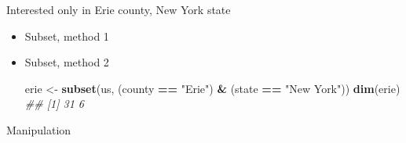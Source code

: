 \documentclass[]{book}
\newenvironment{Shaded}{\begin{snugshade}}{\end{snugshade}}
\newcommand{\CommentTok}[1]{\textcolor[rgb]{0.56,0.35,0.01}{\textit{#1}}}
\newcommand{\KeywordTok}[1]{\textcolor[rgb]{0.13,0.29,0.53}{\textbf{#1}}}
\newcommand{\NormalTok}[1]{#1}
\newcommand{\OperatorTok}[1]{\textcolor[rgb]{0.81,0.36,0.00}{\textbf{#1}}}
\newcommand{\StringTok}[1]{\textcolor[rgb]{0.31,0.60,0.02}{#1}}
\begin{document}
Interested only in Erie county, New York state

\begin{itemize}
\item
  Subset, method 1

\begin{Shaded}
\end{Shaded}
\item
  Subset, method 2

\begin{Shaded}
\begin{Highlighting}[]
\NormalTok{erie <-}\StringTok{ }\KeywordTok{subset}\NormalTok{(us, (county }\OperatorTok{==}\StringTok{ "Erie"}\NormalTok{) }\OperatorTok{&}\StringTok{ }\NormalTok{(state }\OperatorTok{==}\StringTok{ "New York"}\NormalTok{))}
\KeywordTok{dim}\NormalTok{(erie)}
\CommentTok{## [1] 31  6}
\end{Highlighting}
\end{Shaded}
\end{itemize}

Manipulation
\end{document}
